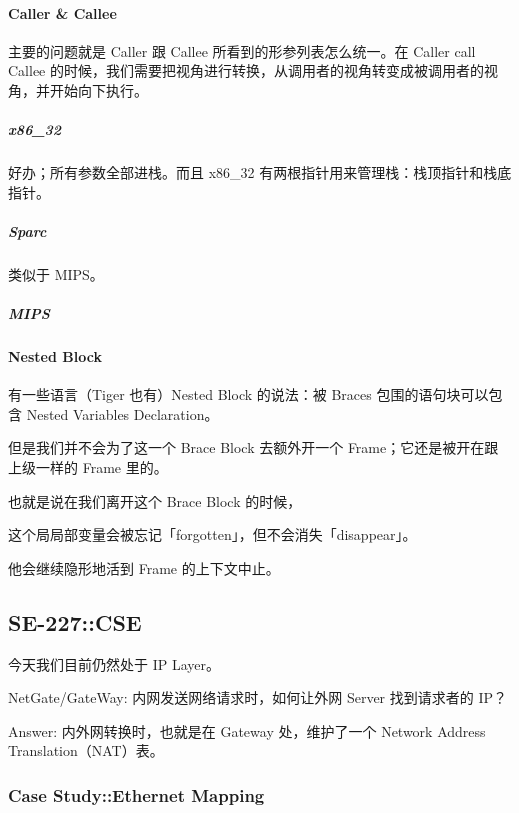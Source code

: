 \documentclass[
]{article}
\begin{document}
\hypertarget{header-n71}{%
\paragraph{Caller \& Callee}\label{header-n71}}

主要的问题就是 Caller 跟 Callee 所看到的形参列表怎么统一。在 Caller call
Callee
的时候，我们需要把视角进行转换，从调用者的视角转变成被调用者的视角，并开始向下执行。

\hypertarget{header-n73}{%
\subparagraph{x86\_32}\label{header-n73}}

好办；所有参数全部进栈。而且 x86\_32
有两根指针用来管理栈：栈顶指针和栈底指针。

\hypertarget{header-n75}{%
\subparagraph{Sparc}\label{header-n75}}

类似于 MIPS。

\hypertarget{header-n77}{%
\subparagraph{MIPS}\label{header-n77}}

\hypertarget{header-n78}{%
\paragraph{Nested Block}\label{header-n78}}

有一些语言（Tiger 也有）Nested Block 的说法：被 Braces
包围的语句块可以包含 Nested Variables Declaration。

但是我们并不会为了这一个 Brace Block 去额外开一个
Frame；它还是被开在跟上级一样的 Frame 里的。

也就是说在我们离开这个 Brace Block 的时候，

这个局局部变量会被忘记「forgotten」，但不会消失「disappear」。

他会继续隐形地活到 Frame 的上下文中止。

\hypertarget{header-n84}{%
\subsection{SE-227::CSE}\label{header-n84}}

今天我们目前仍然处于 IP Layer。

NetGate/GateWay: 内网发送网络请求时，如何让外网 Server 找到请求者的 IP？

Answer: 内外网转换时，也就是在 Gateway 处，维护了一个 Network Address
Translation（NAT）表。

\hypertarget{header-n88}{%
\subsubsection{Case Study::Ethernet Mapping}\label{header-n88}}
\end{document}

